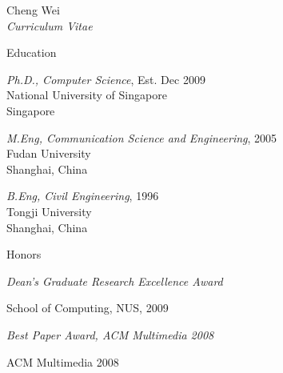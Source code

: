 \documentclass[10pt]{article}
\newenvironment{sublist}{%
	\begin{list}{}{%
		\setlength{\itemsep}{0em}\setlength{\parsep}{0em}%
		\setlength{\topsep}{0em}\setlength{\parskip}{0em}%
	}%
}%
{ \end{list} }
\begin{document}
\begin{cv}{Cheng Wei\\{\large \itshape Curriculum Vitae}}
\begin{cvlist}{Education}
	\item \emph{Ph.D., Computer Science}, Est. Dec 2009\\
	National University of Singapore\\
        Singapore
	\item \emph{M.Eng, Communication Science and Engineering}, 2005\\ 
	Fudan University\\
	Shanghai, China
	\item \emph{B.Eng, Civil Engineering}, 1996\\
	Tongji University\\
	Shanghai, China
\end{cvlist}

\begin{cvlist}{Honors}
\item
    \emph{Dean's Graduate Research Excellence Award}
	\begin{sublist}
	\item School of Computing, NUS, 2009
	\end{sublist}
\item
    \emph{Best Paper Award, ACM Multimedia 2008}
	\begin{sublist}
	\item ACM Multimedia 2008
	\end{sublist}
\end{cvlist}


\end{cv}
\end{document}

